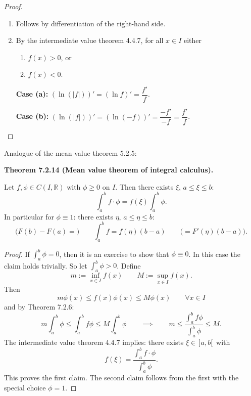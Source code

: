 \documentclass[12pt]{article}
\newenvironment{satz}[1]{%
  \par\vspace{6pt}\noindent\textbf{Theorem #1.}\itshape\space
}{%
  \par\vspace{6pt}
}
\begin{document}
\begin{proof}
\begin{enumerate}
    \item Follows by differentiation of the right-hand side.

    \item By the intermediate value theorem 4.4.7, for all $x\in I$ either
    \begin{enumerate}
        \item[(a)] $f(x)>0$, or
        \item[(b)] $f(x)<0$.
    \end{enumerate}

    \textbf{Case (a):} $(\ln(|f|))'=(\ln f)'=\dfrac{f'}{f}$.

    \textbf{Case (b):} $(\ln(|f|))'=(\ln(-f))'=\dfrac{-f'}{-f}=\dfrac{f'}{f}$.
\end{enumerate}
\end{proof}

\noindent Analogue of the mean value theorem 5.2.5:

\begin{satz}{7.2.14 (Mean value theorem of integral calculus)}
Let $f,\phi\in C(I,\mathbb R)$ with $\phi\ge 0$ on $I$. Then there exists $\xi$, $a\le\xi\le b$:
\[
\int_a^b f\cdot\phi=f(\xi)\int_a^b\phi.
\]
In particular for $\phi\equiv 1$: there exists $\eta$, $a\le\eta\le b$:
\[
\bigl(F(b)-F(a)=\bigr)\qquad\int_a^b f=f(\eta)(b-a)\qquad\bigl(=F'(\eta)(b-a)\bigr).
\]
\end{satz}

\begin{proof}
If $\int_a^b\phi=0$, then it is an exercise to show that $\phi\equiv 0$. In this case
the claim holds trivially. So let $\int_a^b\phi>0$. Define
\[
m:=\inf_{x\in I}f(x)\qquad M:=\sup_{x\in I}f(x).
\]
Then
\[
m\phi(x)\le f(x)\phi(x)\le M\phi(x)\qquad\forall x\in I
\]
and by Theorem 7.2.6:
\[
m\int_a^b\phi\le\int_a^b f\phi\le M\int_a^b\phi
\qquad\implies\qquad
m\le\frac{\int_a^b f\phi}{\int_a^b\phi}\le M.
\]
The intermediate value theorem 4.4.7 implies: there exists $\xi\in\,]a,b[\,$ with
\[
f(\xi)=\frac{\int_a^b f\cdot\phi}{\int_a^b\phi}.
\]
This proves the first claim. The second claim follows from the first with the special choice $\phi=1$.
\end{proof}
\end{document}
